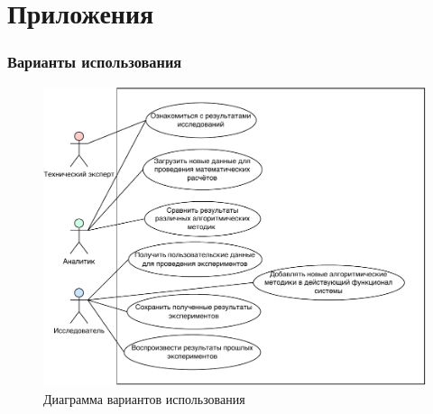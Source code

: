 \appendix
\section{Приложения}

\begin{frame}
\frametitle{Варианты использования}
\begin{figure}
    \includegraphics[scale=.48]{pictures/analysis/usecase}
    \caption{Диаграмма вариантов использования}
\end{figure}
\end{frame}


